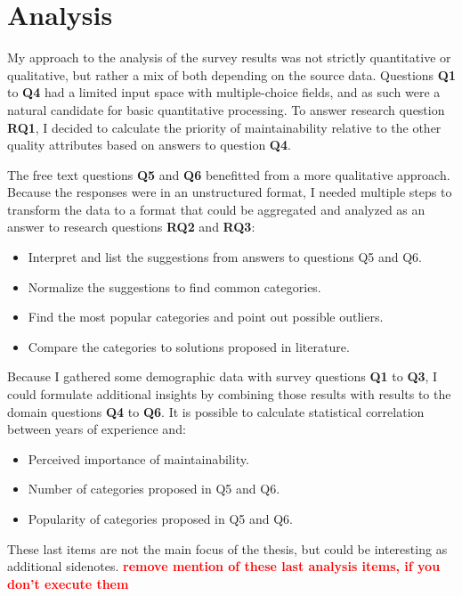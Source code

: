 \documentclass[utf8,english]{gradu3}
\newcommand{\todo}[1]{\textbf{\textcolor{red}{#1}}}
\begin{document}
\section{Analysis}

My approach to the analysis of the survey results was not strictly quantitative or qualitative, but rather a mix of both depending on the source data.
Questions \textbf{Q1} to \textbf{Q4} had a limited input space with multiple-choice fields, and as such were a natural candidate for basic quantitative processing.
To answer research question \textbf{RQ1}, I decided to calculate the priority of maintainability relative to the other quality attributes based on answers to question \textbf{Q4}.

The free text questions \textbf{Q5} and \textbf{Q6} benefitted from a more qualitative approach.
Because the responses were in an unstructured format, I needed multiple steps to transform the
data to a format that could be aggregated and analyzed as an answer to
research questions \textbf{RQ2} and \textbf{RQ3}:
\begin{itemize}
  \item Interpret and list the suggestions from answers to questions Q5 and Q6.
  \item Normalize the suggestions to find common categories.
  \item Find the most popular categories and point out possible outliers.
  \item Compare the categories to solutions proposed in literature.
\end{itemize}

Because I gathered some demographic data with survey questions \textbf{Q1} to \textbf{Q3},
I could formulate additional insights by combining those results with results to the domain questions \textbf{Q4} to \textbf{Q6}.
It is possible to calculate statistical correlation between years of experience and:
\begin{itemize}
  \item Perceived importance of maintainability.
  \item Number of categories proposed in Q5 and Q6.
  \item Popularity of categories proposed in Q5 and Q6.
\end{itemize}

These last items are not the main focus of the thesis, but could be interesting
as additional sidenotes.  \todo{remove mention of these last analysis items, if
  you don't execute them}
\end{document}
